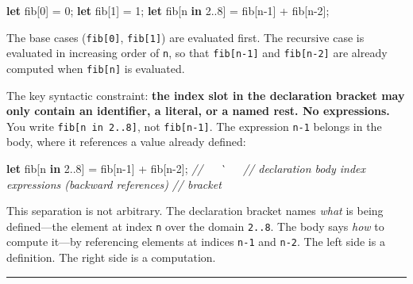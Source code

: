 \documentclass[11pt,]{article}
\newenvironment{Shaded}{}{}
\newcommand{\CommentTok}[1]{\textcolor[rgb]{0.38,0.63,0.69}{\textit{#1}}}
\newcommand{\DecValTok}[1]{\textcolor[rgb]{0.25,0.63,0.44}{#1}}
\newcommand{\KeywordTok}[1]{\textcolor[rgb]{0.00,0.44,0.13}{\textbf{#1}}}
\newcommand{\NormalTok}[1]{#1}
\newcommand{\OperatorTok}[1]{\textcolor[rgb]{0.40,0.40,0.40}{#1}}
\begin{document}
\begin{Shaded}
\begin{Highlighting}[]
\KeywordTok{let}\NormalTok{ fib}\OperatorTok{[}\DecValTok{0}\OperatorTok{]}\NormalTok{ = }\DecValTok{0}\NormalTok{;}
\KeywordTok{let}\NormalTok{ fib}\OperatorTok{[}\DecValTok{1}\OperatorTok{]}\NormalTok{ = }\DecValTok{1}\NormalTok{;}
\KeywordTok{let}\NormalTok{ fib}\OperatorTok{[}\NormalTok{n }\KeywordTok{in} \DecValTok{2.}\NormalTok{.}\DecValTok{8}\OperatorTok{]}\NormalTok{ = fib}\OperatorTok{[}\NormalTok{n-}\DecValTok{1}\OperatorTok{]}\NormalTok{ + fib}\OperatorTok{[}\NormalTok{n-}\DecValTok{2}\OperatorTok{]}\NormalTok{;}
\end{Highlighting}
\end{Shaded}

The base cases (\texttt{fib{[}0{]}}, \texttt{fib{[}1{]}}) are evaluated
first. The recursive case is evaluated in increasing order of
\texttt{n}, so that \texttt{fib{[}n-1{]}} and \texttt{fib{[}n-2{]}} are
already computed when \texttt{fib{[}n{]}} is evaluated.

The key syntactic constraint: \textbf{the index slot in the declaration
bracket may only contain an identifier, a literal, or a named rest. No
expressions.} You write \texttt{fib{[}n\ in\ 2..8{]}}, not
\texttt{fib{[}n-1{]}}. The expression \texttt{n-1} belongs in the body,
where it references a value already defined:

\begin{Shaded}
\begin{Highlighting}[]
\KeywordTok{let}\NormalTok{ fib}\OperatorTok{[}\NormalTok{n }\KeywordTok{in} \DecValTok{2.}\NormalTok{.}\DecValTok{8}\OperatorTok{]}\NormalTok{ = fib}\OperatorTok{[}\NormalTok{n-}\DecValTok{1}\OperatorTok{]}\NormalTok{ + fib}\OperatorTok{[}\NormalTok{n-}\DecValTok{2}\OperatorTok{]}\NormalTok{;}
\CommentTok{//  ^^^^^^^^^^^^^^   ^^^  ^^^}
\CommentTok{//  declaration      body index expressions (backward references)}
\CommentTok{//  bracket}
\end{Highlighting}
\end{Shaded}

This separation is not arbitrary. The declaration bracket names
\emph{what} is being defined---the element at index \texttt{n} over the
domain \texttt{2..8}. The body says \emph{how} to compute it---by
referencing elements at indices \texttt{n-1} and \texttt{n-2}. The left
side is a definition. The right side is a computation.

\begin{center}\rule{0.5\linewidth}{0.4pt}\end{center}
\end{document}
